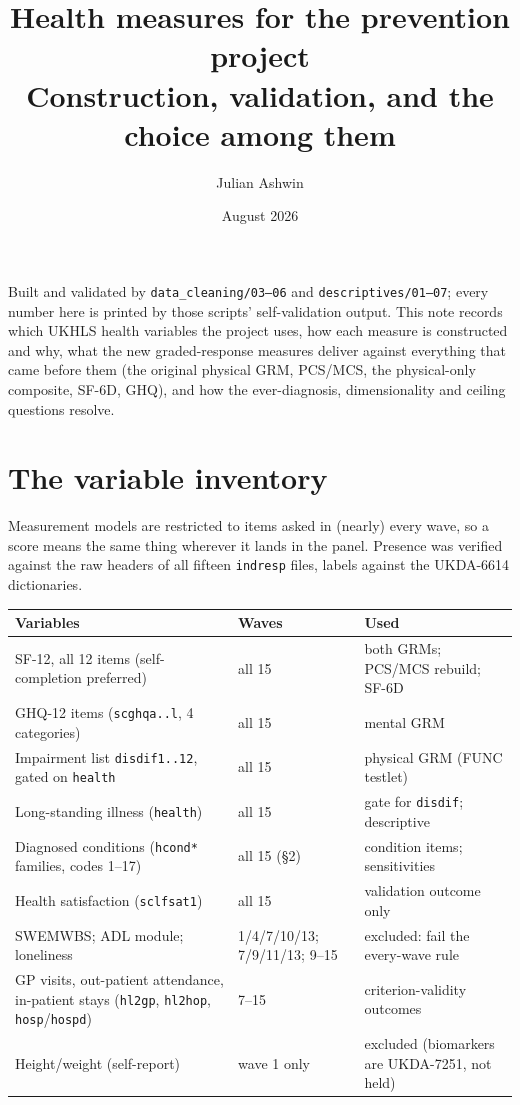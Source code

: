 \documentclass[11pt]{article}
\title{Health measures for the prevention project\\[2pt]
\large Construction, validation, and the choice among them}
\author{Julian Ashwin}
\date{August 2026}
\newcommand{\code}[1]{\texttt{\small #1}}
\begin{document}
\maketitle

\noindent Built and validated by \code{data\_cleaning/03--06} and
\code{descriptives/01--07}; every number here is printed by those scripts'
self-validation output. This note records which UKHLS health variables the
project uses, how each measure is constructed and why, what the new
graded-response measures deliver against everything that came before them
(the original physical GRM, PCS/MCS, the physical-only composite, SF-6D,
GHQ), and how the ever-diagnosis, dimensionality and ceiling questions
resolve.

\tableofcontents

\section{The variable inventory}

Measurement models are restricted to items asked in (nearly) every wave, so a
score means the same thing wherever it lands in the panel. Presence was
verified against the raw headers of all fifteen \code{indresp} files, labels
against the UKDA-6614 dictionaries.

\begin{center}\small
\begin{tabular}{p{7.6cm}p{2.4cm}p{4.6cm}}
\toprule
Variables & Waves & Used \\
\midrule
SF-12, all 12 items (self-completion preferred) & all 15 & both GRMs; PCS/MCS rebuild; SF-6D \\
GHQ-12 items (\code{scghqa..l}, 4 categories) & all 15 & mental GRM \\
Impairment list \code{disdif1..12}, gated on \code{health} & all 15 & physical GRM (FUNC testlet) \\
Long-standing illness (\code{health}) & all 15 & gate for \code{disdif}; descriptive \\
Diagnosed conditions (\code{hcond*} families, codes 1--17) & all 15 (\S2) & condition items; sensitivities \\
Health satisfaction (\code{sclfsat1}) & all 15 & validation outcome only \\
SWEMWBS; ADL module; loneliness & 1/4/7/10/13; 7/9/11/13; 9--15 & excluded: fail the every-wave rule \\
GP visits, out-patient attendance, in-patient stays (\code{hl2gp}, \code{hl2hop}, \code{hosp}/\code{hospd}) & 7--15 & criterion-validity outcomes \\
Height/weight (self-report) & wave 1 only & excluded (biomarkers are UKDA-7251, not held) \\
\bottomrule
\end{tabular}
\end{center}
\end{document}
